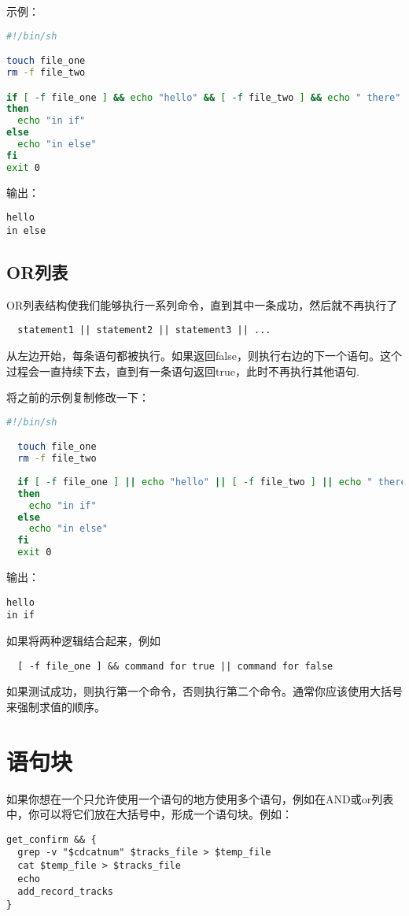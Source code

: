 \documentclass[a4paper]{ctexart}
\begin{document}
示例：
\begin{lstlisting}[language=sh]
#!/bin/sh

touch file_one
rm -f file_two

if [ -f file_one ] && echo "hello" && [ -f file_two ] && echo " there"
then
  echo "in if"
else
  echo "in else"
fi
exit 0
\end{lstlisting}
输出：
\begin{lstlisting}
hello
in else
\end{lstlisting}

\subsection{OR列表}
OR列表结构使我们能够执行一系列命令，直到其中一条成功，然后就不再执行了
\begin{lstlisting}
  statement1 || statement2 || statement3 || ...
\end{lstlisting}
从左边开始，每条语句都被执行。如果返回false，则执行右边的下一个语句。这个过程会一直持续下去，直到有一条语句返回true，此时不再执行其他语句.

将之前的示例复制修改一下：
\begin{lstlisting}[language=sh]
  #!/bin/sh

  touch file_one
  rm -f file_two
  
  if [ -f file_one ] || echo "hello" || [ -f file_two ] || echo " there"
  then
    echo "in if"
  else
    echo "in else"
  fi
  exit 0
\end{lstlisting}
输出：
\begin{lstlisting}
hello
in if
\end{lstlisting}

如果将两种逻辑结合起来，例如
\begin{lstlisting}
  [ -f file_one ] && command for true || command for false
\end{lstlisting}
如果测试成功，则执行第一个命令，否则执行第二个命令。通常你应该使用大括号来强制求值的顺序。

\section{语句块}
如果你想在一个只允许使用一个语句的地方使用多个语句，例如在AND或or列表中，你可以将它们放在大括号{}中，形成一个语句块。例如：
\begin{lstlisting}
get_confirm && {
  grep -v "$cdcatnum" $tracks_file > $temp_file
  cat $temp_file > $tracks_file
  echo
  add_record_tracks
}
\end{lstlisting}
\end{document}
